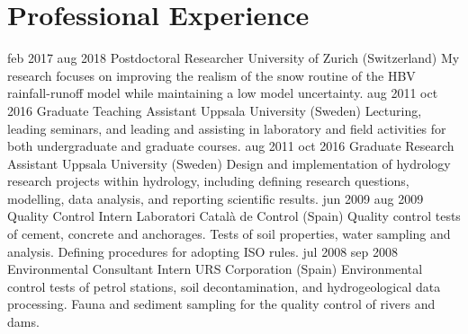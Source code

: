     \section{Professional Experience}
        \position
            {feb 2017 \textemdash{} aug 2018}
            {Postdoctoral Researcher}
            {University of Zurich (Switzerland)}
            {My research focuses on improving the realism of the snow routine of the HBV rainfall-runoff model while maintaining a low model uncertainty.}
        \position
            {aug 2011 \textemdash{} oct 2016}
            {Graduate Teaching Assistant}
            {Uppsala University (Sweden)}
            {Lecturing, leading seminars, and leading and assisting in laboratory and field activities for both undergraduate and graduate courses.}
        \position
            {aug 2011 \textemdash{} oct 2016}
            {Graduate Research Assistant}
            {Uppsala University (Sweden)}
            {Design and implementation of hydrology research projects within hydrology, including defining research questions, modelling, data analysis, and reporting scientific results.}
        \position
            {jun 2009 \textemdash{} aug 2009}
            {Quality Control Intern}
            {Laboratori Català de Control (Spain)}
            {Quality control tests of cement, concrete and anchorages. Tests of soil properties, water sampling and analysis. Defining procedures for adopting ISO rules.}
        \position
            {jul 2008 \textemdash{} sep 2008}
            {Environmental Consultant Intern}
            {URS Corporation (Spain)}
            {Environmental control tests of petrol stations, soil decontamination, and hydrogeological data processing. Fauna and sediment sampling for the quality control of rivers and dams.}
\fi

